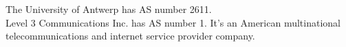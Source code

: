 The University of Antwerp has AS number 2611. \\
Level 3 Communications Inc. has AS number 1. It's an American multinational telecommunications and internet service provider company.